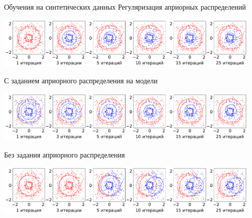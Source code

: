 \documentclass[9pt,pdf,hyperref={unicode}]{beamer}
\begin{document}
\begin{frame}{Обучения на синтетических данных}
\justifying
Регуляризация априорных распределений
\begin{center}
	\includegraphics[width=0.95\textwidth]{result/experiment_synt_regular_progress}
\end{center}
С заданием априорного распределения на модели
\begin{center}
	\includegraphics[width=0.95\textwidth]{result/experiment_synt_prior_progress}
\end{center}
Без задания априорного распределения
\begin{center}
	\includegraphics[width=0.95\textwidth]{result/experiment_synt_not_prior_progress}
\end{center}
\end{frame}
\end{document}

